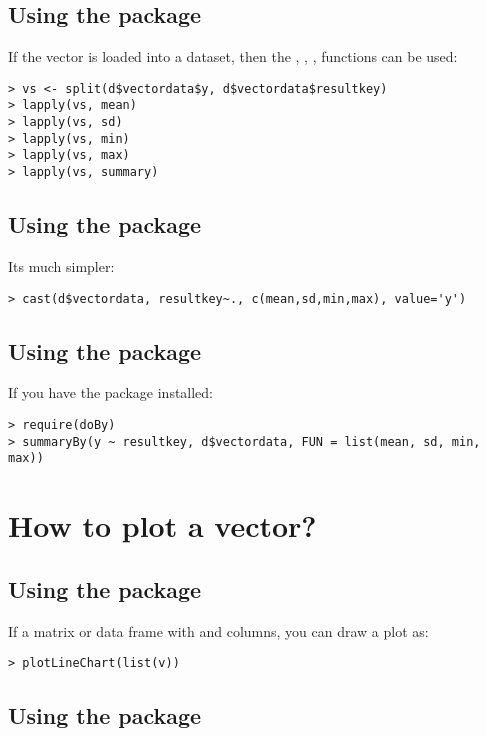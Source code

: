 \subsection{Using the  package}

If the vector is loaded into a dataset, then the , , , 
functions can be used:

\begin{verbatim}
> vs <- split(d$vectordata$y, d$vectordata$resultkey)
> lapply(vs, mean)
> lapply(vs, sd)
> lapply(vs, min)
> lapply(vs, max)
> lapply(vs, summary)
\end{verbatim}

\subsection{Using the  package}

Its much simpler:

\begin{verbatim}
> cast(d$vectordata, resultkey~., c(mean,sd,min,max), value='y')
\end{verbatim}

\subsection{Using the  package}

If you have the  package installed:

\begin{verbatim}
> require(doBy)
> summaryBy(y ~ resultkey, d$vectordata, FUN = list(mean, sd, min, max))
\end{verbatim}


\section{How to plot a vector?}

\subsection{Using the  package}

If  a matrix or data frame with  and  columns, you can draw a plot as:

\begin{verbatim}
> plotLineChart(list(v))
\end{verbatim}

\subsection{Using the  package}

